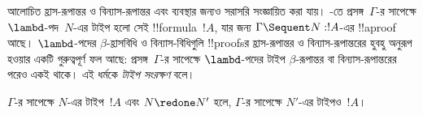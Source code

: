 \documentclass[../../../include/open-logic-section]{subfiles}
\begin{document}


আলোচিত হ্রাস-রূপান্তর ও বিন্যাস-রূপান্তর
 এবং  ব্যবস্থার জন্যও
সরাসরি সংজ্ঞায়িত করা যায়। -তে
প্রসঙ্গ~$\Gamma$-র সাপেক্ষে $\lambd$-পদ~$N$-এর
টাইপ হলো সেই !!{formula}~$!A$, যার জন্য
$\Gamma \Sequent N : !A$-এর !!a{proof} আছে।
$\lambd$-পদের $\beta$-হ্রাসবিধি ও বিন্যাস-বিধিগুলি !!{proof}sর
হ্রাস-রূপান্তর ও বিন্যাস-রূপান্তরের হুবহু
অনুরূপ হওয়ার একটি গুরুত্বপূর্ণ ফল আছে:
প্রসঙ্গ~$\Gamma$-র সাপেক্ষে $\lambd$-পদের
টাইপ $\beta$-রূপান্তর বা বিন্যাস-রূপান্তরের পরেও একই থাকে।
এই ধর্মকে \emph{টাইপ সংরক্ষণ} বলে।

\begin{prop}
$\Gamma$-র সাপেক্ষে $N$-এর টাইপ~$!A$
এবং $N \redone N'$ হলে, $\Gamma$-র
সাপেক্ষে $N'$-এর টাইপও~$!A$।
\end{prop}
\end{document}
